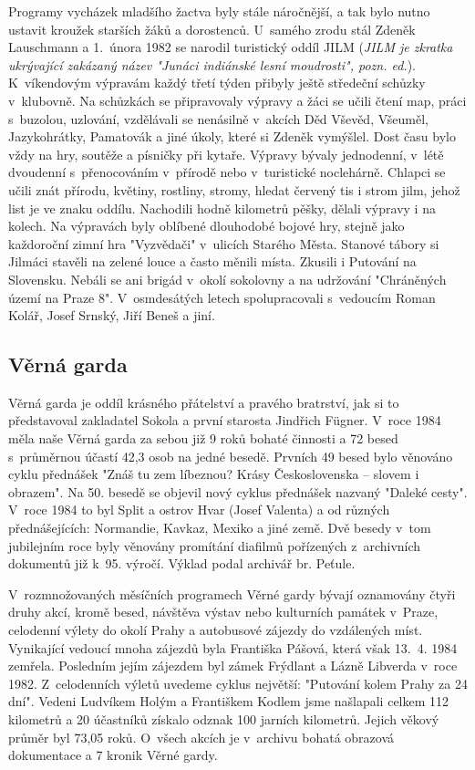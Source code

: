 \documentclass[a5paper, 11pt, twoside]{article}
\begin{document}
Programy vycházek mladšího žactva byly stále náročnější, a tak bylo
nutno ustavit kroužek starších žáků a dorostenců. U~samého zrodu stál
Zdeněk Lauschmann a 1.~února 1982 se narodil turistický oddíl JILM
(\textit{JILM je zkratka ukrývající zakázaný název "Junáci indiánské lesní moudrosti", pozn. ed.}). K~víkendovým výpravám každý třetí týden
přibyly ještě středeční schůzky v~klubovně. Na schůzkách se připravovaly
výpravy a žáci se učili čtení map, práci s~buzolou, uzlování, vzdělávali
se nenásilně v~akcích Děd Vševěd, Všeuměl, Jazykohrátky, Pamatovák a
jiné úkoly, které si Zdeněk vymýšlel. Dost času bylo vždy na hry,
soutěže a písničky při kytaře. Výpravy bývaly jednodenní, v~létě
dvoudenní s~přenocováním v~přírodě nebo v~turistické noclehárně. Chlapci
se učili znát přírodu, květiny, rostliny, stromy, hledat červený tis i
strom jilm, jehož list je ve znaku oddílu. Nachodili hodně kilometrů
pěšky, dělali výpravy i na kolech. Na výpravách byly oblíbené dlouhodobé
bojové hry, stejně jako každoroční zimní hra "Vyzvědači" v~ulicích
Starého Města. Stanové tábory si Jilmáci stavěli na zelené louce a často
měnili místa. Zkusili i Putování na Slovensku. Nebáli se ani brigád
v~okolí sokolovny a na udržování "Chráněných území na Praze 8".
V~osmdesátých letech spolupracovali s~vedoucím Roman Kolář, Josef Srnský,
Jiří Beneš a jiní.

\subsection{Věrná garda}

Věrná garda je oddíl krásného přátelství a pravého bratrství, jak si to
představoval zakladatel Sokola a první starosta Jindřich Fügner. V~roce
1984 měla naše Věrná garda za sebou již 9 roků bohaté činnosti a 72
besed s~průměrnou účastí 42,3 osob na jedné besedě. Prvních 49 besed
bylo věnováno cyklu přednášek "Znáš tu zem líbeznou? Krásy
Československa -- slovem i obrazem". Na 50. besedě se objevil nový
cyklus přednášek nazvaný "Daleké cesty". V~roce 1984 to byl Split a
ostrov Hvar (Josef Valenta) a od různých přednášejících: Normandie,
Kavkaz, Mexiko a jiné země. Dvě besedy v~tom jubilejním roce byly
věnovány promítání diafilmů pořízených z~archivních dokumentů již k~95.
výročí. Výklad podal archivář br. Peťule.

V~rozmnožovaných měsíčních programech Věrné gardy bývají oznamovány
čtyři druhy akcí, kromě besed, návštěva výstav nebo kulturních památek
v~Praze, celodenní výlety do okolí Prahy a autobusové zájezdy do
vzdálených míst. Vynikající vedoucí mnoha zájezdů byla Františka Pášová,
která však 13.~4. 1984 zemřela. Posledním jejím zájezdem byl zámek
Frýdlant a Lázně Libverda v~roce 1982. Z~celodenních výletů uvedeme
cyklus největší: "Putování kolem Prahy za 24 dní". Vedeni Ludvíkem
Holým a Františkem Kodlem jsme našlapali celkem 112 kilometrů a 20
účastníků získalo odznak 100 jarních kilometrů. Jejich věkový průměr byl
73,05 roků. O~všech akcích je v~archivu bohatá obrazová dokumentace a 7
kronik Věrné gardy.
\end{document}
